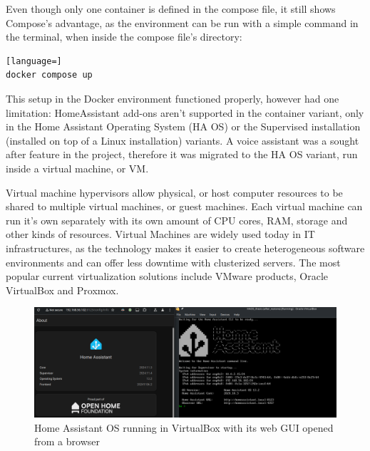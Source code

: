 Even though only one container is defined in the compose file, it still shows Compose's advantage, as the environment can be run with a simple command in the terminal, when inside the compose file's directory:

\begin{lstlisting}[language=]
docker compose up
\end{lstlisting}

This setup in the Docker environment functioned properly, however had one limitation: HomeAssistant add-ons aren't supported in the container variant, only in the Home Assistant Operating System (HA OS) or the Supervised installation (installed on top of a Linux installation) variants. A voice assistant was a sought after feature in the project, therefore it was migrated to the HA OS variant, run inside a virtual machine, or VM.

Virtual machine hypervisors allow physical, or host computer resources to be shared to multiple virtual machines, or guest machines. \cite{VMwareVM} Each virtual machine can run it's own separately with its own amount of CPU cores, RAM, storage and other kinds of resources. Virtual Machines are widely used today in IT infrastructures, as the technology makes it easier to create heterogeneous software environments and can offer less downtime with clusterized servers. The most popular current virtualization solutions include VMware products, Oracle VirtualBox and Proxmox. \cite{G2freeVM}

\begin{figure}[!ht]
  \centering
  \includegraphics[width=150mm, keepaspectratio]{figures/homeassistant_about.png}
  \caption{Home Assistant OS running in VirtualBox with its web GUI opened from a browser}
  \label{fig:HAabout}
\end{figure}

